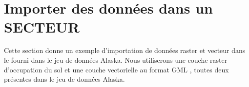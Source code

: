 \section{Importer des données dans un SECTEUR \grass}\label{sec:import_loc_data}

Cette section donne un exemple d'importation de données raster et vecteur dans le  \grass {} fourni dans le jeu de données \qg Alaska. Nous utiliserons une couche raster d'occupation du sol  et une couche vectorielle au format GML , toutes deux présentes dans le jeu de données Alaska.

